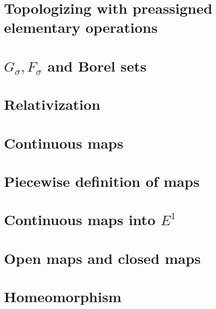 \section{Topologizing with preassigned elementary operations}

\section{\( G_{\sigma}, F_{\sigma} \) and Borel sets}

\section{Relativization}

\section{Continuous maps}

\section{Piecewise definition of maps}

\section{Continuous maps into \( E^{1} \)}

\section{Open maps and closed maps}

\section{Homeomorphism}

